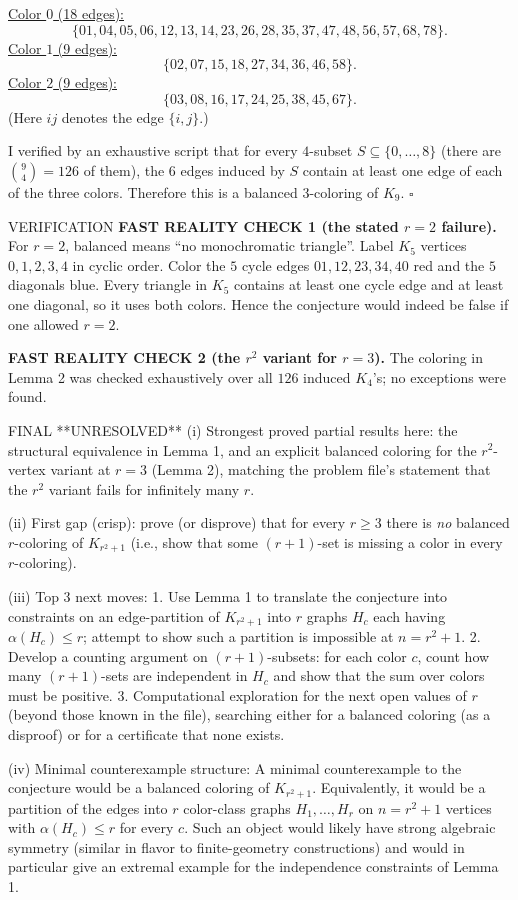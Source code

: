 \underline{Color $0$ (18 edges):}
\[
\{01,04,05,06,12,13,14,23,26,28,35,37,47,48,56,57,68,78\}.
\]
\underline{Color $1$ (9 edges):}
\[
\{02,07,15,18,27,34,36,46,58\}.
\]
\underline{Color $2$ (9 edges):}
\[
\{03,08,16,17,24,25,38,45,67\}.
\]
(Here $ij$ denotes the edge $\{i,j\}$.)

I verified by an exhaustive script that for every $4$-subset $S\subseteq\{0,\dots,8\}$
(there are ${9\choose 4}=126$ of them), the $6$ edges induced by $S$ contain at
least one edge of each of the three colors.
Therefore this is a balanced $3$-coloring of $K_9$.
\hfill $\square$

VERIFICATION
\textbf{FAST REALITY CHECK 1 (the stated $r=2$ failure).}
For $r=2$, balanced means ``no monochromatic triangle''.
Label $K_5$ vertices $0,1,2,3,4$ in cyclic order.
Color the $5$ cycle edges
$01,12,23,34,40$ red and the $5$ diagonals blue.
Every triangle in $K_5$ contains at least one cycle edge and at least one diagonal,
so it uses both colors. Hence the conjecture would indeed be false if one
allowed $r=2$.

\textbf{FAST REALITY CHECK 2 (the $r^2$ variant for $r=3$).}
The coloring in Lemma 2 was checked exhaustively over all $126$ induced $K_4$'s;
no exceptions were found.

FINAL
**UNRESOLVED**
(i) Strongest proved partial results here: the structural equivalence in Lemma 1,
and an explicit balanced coloring for the $r^2$-vertex variant at $r=3$ (Lemma 2),
matching the problem file's statement that the $r^2$ variant fails for infinitely
many $r$.

(ii) First gap (crisp): prove (or disprove) that for every $r\ge3$ there is \emph{no}
balanced $r$-coloring of $K_{r^2+1}$ (i.e., show that some $(r+1)$-set is missing a
color in every $r$-coloring).

(iii) Top 3 next moves:
1. Use Lemma 1 to translate the conjecture into constraints on an edge-partition
of $K_{r^2+1}$ into $r$ graphs $H_c$ each having $\alpha(H_c)\le r$; attempt to show
such a partition is impossible at $n=r^2+1$.
2. Develop a counting argument on $(r+1)$-subsets:
for each color $c$, count how many $(r+1)$-sets are independent in $H_c$ and show
that the sum over colors must be positive.
3. Computational exploration for the next open values of $r$ (beyond those known
in the file), searching either for a balanced coloring (as a disproof) or for a
certificate that none exists.

(iv) Minimal counterexample structure:
A minimal counterexample to the conjecture would be a balanced coloring of
$K_{r^2+1}$.
Equivalently, it would be a partition of the edges into $r$ color-class graphs
$H_1,\dots,H_r$ on $n=r^2+1$ vertices with $\alpha(H_c)\le r$ for every $c$.
Such an object would likely have strong algebraic symmetry (similar in flavor to
finite-geometry constructions) and would in particular give an extremal example
for the independence constraints of Lemma 1.



